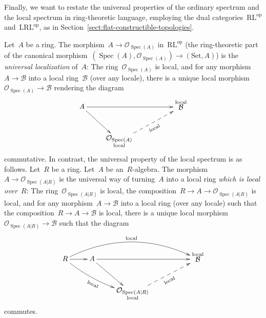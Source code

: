\documentclass[10pt,reqno,a4paper]{amsbook}
\theoremstyle{definition}
\theoremstyle{plain}
\theoremstyle{remark}
\newcommand{\B}{\mathcal{B}}
\renewcommand{\O}{\mathcal{O}}
\newcommand{\Set}{\mathrm{Set}}
\newcommand{\RL}{\mathrm{RL}}
\newcommand{\LRL}{\mathrm{LRL}}
\DeclareMathOperator{\Spec}{Spec}
\newcommand{\op}{\mathrm{op}}
\newcommand{\?}{\,{:}\,}
\renewcommand{\_}{\mathpunct{.}\,}
\begin{document}
Finally, we want to restate the universal properties of the ordinary spectrum
and the local spectrum in ring-theoretic language, employing the dual
categories~$\RL^\op$ and~$\LRL^\op$, as in
Section~\ref{sect:flat-constructible-topologies}.

Let~$A$ be a ring. The morphism~$A \to \O_{\Spec(A)}$ in~$\RL^\op$ (the
ring-theoretic part of the canonical morphism~$(\Spec(A), \O_{\Spec(A)}) \to
(\Set, A)$) is the \emph{universal localization} of~$A$: The
ring~$\O_{\Spec(A)}$ is local, and for any morphism~$A \to \B$ into a local
ring~$\B$ (over any locale), there is a unique local morphism~$\O_{\Spec(A)}
\to \B$ rendering the diagram
\[ \xymatrix{
  A \ar[rd] \ar[rrr] &&& {\substack{\text{local}\\\text{\normalsize$\B$}\\\phantom{\text{local}}}} \\
  & {\substack{\text{\normalsize$\O_{\Spec(A)}$}\\\text{local}}} \ar@{-->}_[@!29]{\text{local}}[rru]
} \]
commutative. In contrast, the universal property of the local spectrum is as
follows. Let~$R$ be a ring. Let~$A$ be an~$R$-algebra. The morphism~$A \to
\O_{\Spec(A|R)}$ is the universal way of turning~$A$ into a local ring
\emph{which is local over~$R$}: The ring~$\O_{\Spec(A|R)}$ is local, the
composition~$R \to A \to \O_{\Spec(A|R)}$ is local, and for any morphism~$A
\to \B$ into a local ring (over any locale) such that the composition~$R \to A
\to \B$ is local, there is a unique local morphism~$\O_{\Spec(A|R)} \to \B$
such that the diagram
\[ \xymatrix{
  R \ar[r]\ar@/^2pc/[rrrr]^{\text{local}}\ar@/_/[rrd]_[@!-26]{\text{local}} &
    A \ar[rd] \ar[rrr] &&&
    {\substack{\text{local}\\\text{\normalsize$\B$}\\\phantom{\text{local}}}} \\
  && {\substack{\text{\normalsize$\O_{\Spec(A|R)}$}\\\text{local}}} \ar@{-->}[rru]_[@!28]{\text{local}}
} \]
commutes.
\end{document}
